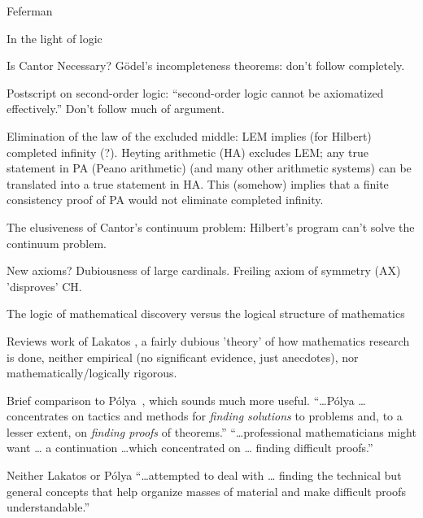 \begin{plSection}{Feferman}
\begin{plSection}{In the light of logic}
\begin{plSection}{Is Cantor Necessary?}
\textmd{G\"{o}del's incompleteness theorems:}
don't follow completely.

\textmd{Postscript on second-order logic:}
``second-order logic cannot be axiomatized effectively.''
Don't follow much of argument.

\textmd{Elimination of the law of the excluded middle:}
\hfill\break
LEM implies (for Hilbert) completed infinity (?).
\hfill\break
Heyting arithmetic (HA) excludes LEM;
any true statement in PA (Peano arithmetic) 
(and many other arithmetic systems)
can be translated into
a true statement in HA.
\hfill\break
This (somehow) implies that a finite consistency proof
of PA would not eliminate completed infinity.

\textmd{The elusiveness of Cantor's continuum problem:}
\hfill\break
Hilbert's program can't solve the continuum problem.


\textmd{New axioms?}
\hfill\break
Dubiousness of large cardinals.
\hfill\break
Freiling axiom of 
symmetry (AX) 
'disproves' CH.

\end{plSection}%
\begin{plSection}{The logic of mathematical discovery 
versus the logical structure of mathematics}
\label{sec:logic_of_mathematical_discovery}


Reviews work of Lakatos ,
a fairly dubious 'theory' of how mathematics research is done,
neither empirical (no significant evidence, just anecdotes),
nor mathematically/logically rigorous.

Brief comparison to 
P\'{o}lya~\cite[ch~3,sec~7]{Feferman:1998:LightOfLogic},
which sounds much more useful. 
``\ldots P\'{o}lya \ldots concentrates on tactics and methods
for \textit{finding solutions} to problems and, 
to a lesser extent,
on \textit{finding proofs} of theorems.''
\hfill\break
``\ldots professional mathematicians might want \ldots
a continuation \ldots which concentrated on \ldots
finding difficult proofs.''

Neither Lakatos or P\'{o}lya ``\ldots attempted to deal with 
\ldots
finding the technical but general concepts that 
help organize masses of material and make difficult 
proofs understandable.''


\end{plSection}
\end{plSection}
\end{plSection}
